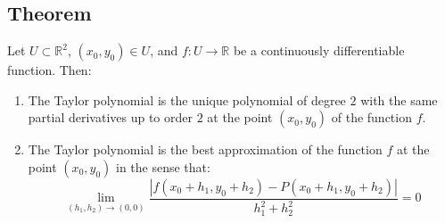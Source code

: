 \documentclass[11pt]{article}
\begin{document}
\subsection{Theorem}
Let $U \subset \mathbb{R}^2$, $(x_0,y_0) \in U$, and $f : U \rightarrow \mathbb{R}$ be a continuously differentiable function. Then:
\begin{enumerate}
    \item The Taylor polynomial is the unique polynomial of degree $2$ with the same partial derivatives up to order $2$ at the point $(x_0,y_0)$ of the function $f$.
    \item The Taylor polynomial is the best approximation of the function $f$ at the point $(x_0,y_0)$ in the sense that:
    \[
    \lim_{(h_1,h_2) \rightarrow (0,0)} \frac{|f(x_0 + h_1, y_0 + h_2) - P(x_0 + h_1, y_0 + h_2)|}{h_1^2 + h_2^2} = 0
    \]
\end{enumerate}
\end{document}
